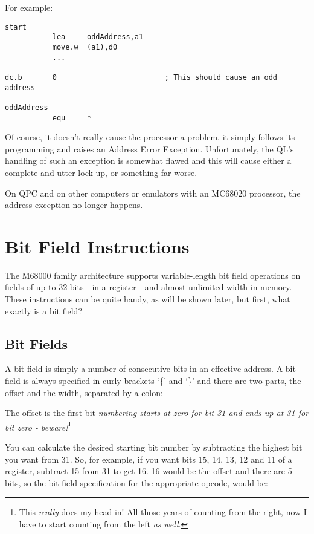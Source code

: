 For example:

\begin{lstlisting}[firstnumber=1,caption={How to Blow Up an MC68008}]
start
           lea     oddAddress,a1
           move.w  (a1),d0
           ...
           
dc.b       0                         ; This should cause an odd address 

oddAddress
           equ     *           
\end{lstlisting}

Of course, it doesn't really cause the processor a problem, it simply follows its programming and raises an Address Error Exception. Unfortunately, the QL's handling of such an exception is somewhat flawed and this will cause either a complete and utter lock up, or something far worse.

On QPC  and on other computers or emulators with an MC68020 processor, the address exception no longer happens.

\section{Bit Field Instructions}

The M68000 family architecture supports variable-length bit field operations on fields of up to 32 bits - in a register - and almost unlimited width in memory. These instructions can be quite handy, as will be shown later, but first, what exactly is a bit field?

\subsection{Bit Fields}\label{chp-mc68020-bitfields}

A bit field is simply a number of consecutive bits in an effective address. A bit field is always specified in curly brackets `\{' and `\}' and there are two parts, the offset and the width, separated by a colon:


The offset is the first bit \emph{numbering starts at zero for bit 31 and ends up at 31 for bit zero - beware!}\footnote{This \emph{really} does my head in! All those years of counting from the right, now I have to start counting from the left \emph{as well}.} 
	
You can calculate the desired starting bit number by subtracting the highest bit you want from 31. So, for example, if you want bits 15, 14, 13, 12 and 11 of a register, subtract 15 from 31 to get 16. 16 would be the offset and there are 5 bits, so the bit field specification for the appropriate opcode, would be:

